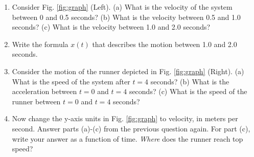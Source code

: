 \documentclass{article}
\begin{document}
\begin{enumerate}
\item Consider Fig. \ref{fig:graph} (Left).  (a) What is the velocity of the system between 0 and 0.5 seconds? (b) What is the velocity between 0.5 and 1.0 seconds? (c) What is the velocity between 1.0 and 2.0 seconds? \\ \vspace{0.5cm}
\item Write the formula $x(t)$ that describes the motion between 1.0 and 2.0 seconds. \\ \vspace{0.5cm}
\item Consider the motion of the runner depicted in Fig. \ref{fig:graph} (Right).  (a) What is the speed of the system after $t = 4$ seconds? (b) What is the acceleration between $t=0$ and $t=4$ seconds? (c) What is the speed of the runner between $t=0$ and $t=4$ seconds? \\ \vspace{1cm}
\item Now change the y-axis units in Fig. \ref{fig:graph} to velocity, in meters per second.  Answer parts (a)-(c) from the previous question again.  For part (c), write your answer as a function of time.  \textit{Where} does the runner reach top speed? \\ \vspace{1cm}
\end{enumerate}
\end{document}
